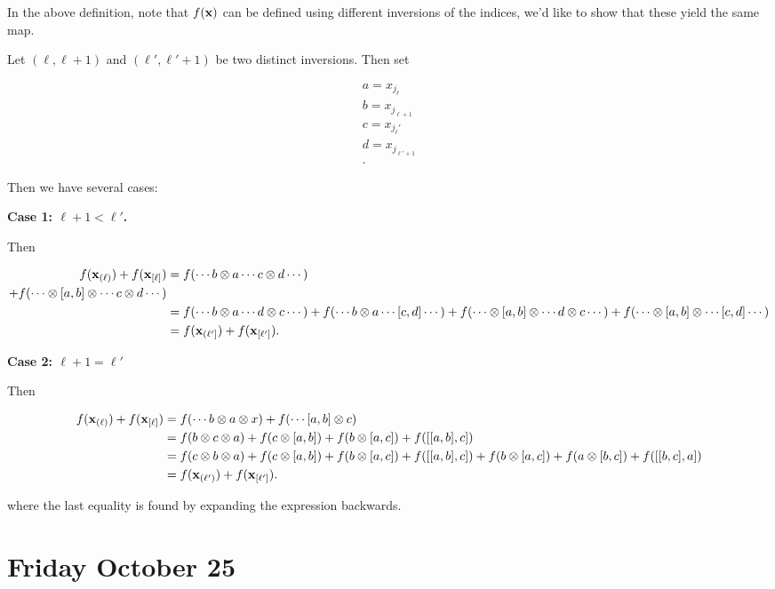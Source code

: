 In the above definition, note that \(f(\mathbf{x})\) can be defined using
different inversions of the indices, we'd like to show that these yield
the same map.

Let \((\ell, \ell+1)\) and \((\ell', \ell'+1)\) be two distinct
inversions. Then set

\begin{align*}
a = x_{j_\ell} \\
b = x_{j_{\ell+1} }\\
c = x_{j_\ell'} \\
d = x_{j_{\ell'+1}} \\
.\end{align*}

Then we have several cases:

\textbf{Case 1: \(\ell + 1 < \ell'\).}

Then

\begin{align*}
f(\mathbf{x}_{(\ell)}) + f(\mathbf{x}_{[\ell]}) 
&= f( \cdots b\otimes a \cdots c\otimes d \cdots ) \\
+ f( \cdots \otimes [a, b] \otimes \cdots c\otimes d \cdots ) \\
&= f( \cdots b\otimes a \cdots d\otimes c \cdots )
+ f( \cdots b\otimes a \cdots [c, d] \cdots )
+ f( \cdots \otimes [a, b] \otimes \cdots d\otimes c \cdots ) 
+ f( \cdots \otimes [a, b] \otimes \cdots [c, d] \cdots ) \\
&= f(\mathbf{x}_{(\ell']}) + f(\mathbf{x}_{[\ell']} )
.\end{align*}

\textbf{Case 2: \(\ell+1 = \ell'\)}

Then

\begin{align*}
f(\mathbf{x}_{(\ell)}) + f(\mathbf{x}_{[\ell]}) 
&= f(\cdots b\otimes a\otimes x) + f(\cdots [a,b] \otimes c) \\
&= f(b\otimes c \otimes a)
+ f(c\otimes [a,b])
+ f(b\otimes [a,c]) +
f([[a,b], c]) \\
&= f(c\otimes b \otimes a)
+ f(c\otimes [a,b])
+ f(b \otimes [a,c])
+ f([[a,b], c]) 
+ f(b\otimes [a,c])
+ f(a \otimes [b, c])
+ f([[b,c], a])\\
&= f(\mathbf{x}_{(\ell')}) + f(\mathbf{x}_{[\ell']})
.\end{align*}

where the last equality is found by expanding the expression backwards.

\hypertarget{friday-october-25}{%
\section{Friday October 25}\label{friday-october-25}}


